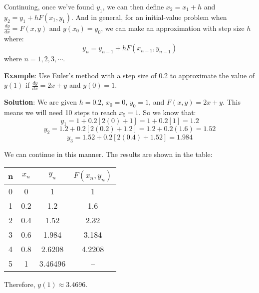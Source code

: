 Continuing, once we've found $y_1$, we can then define $x_2 = x_1 + h$ and 
$y_2 = y_1 + hF(x_1, y_1)$. And in general, for an initial-value problem when 
$\frac{dy}{dx} = F(x, y)$ and $y(x_0) = y_0$, we can make an approximation 
with step size $h$ where:
$$y_n = y_{n-1} + hF(x_{n-1},y_{n-1})$$
where $n = 1, 2, 3, \cdots$. 

\textbf{Example}: Use Euler's method with a step size of 0.2 to approximate 
the value of $y(1)$ if $\frac{dy}{dx} = 2x + y$ and $y(0) = 1$. 

\textbf{Solution}: We are given $h = 0.2$, $x_0 = 0$, $y_0 = 1$, and $F(x, y) 
= 2x + y$. This means we will need 10 steps to reach $x_{5} = 1$. So we know 
that:
$$y_1 = 1 + 0.2[2(0) + 1] = 1 + 0.2[1] = 1.2$$
$$y_2 = 1.2 + 0.2[2(0.2) + 1.2] = 1.2 + 0.2(1.6) = 1.52$$
$$y_3 = 1.52 + 0.2[2(0.4) + 1.52] = 1.984$$

We can continue in this manner. The results are shown in the table:
\begin{center}
\begin{tabular}{|c|c|c|c|}\hline
n & $x_n$ & $y_n$ & $F(x_n, y_n)$ \\\hline
0 & 0 & 1 & 1\\\hline
1 & 0.2 & 1.2 & 1.6\\\hline
2 & 0.4 & 1.52 & 2.32\\\hline
3 & 0.6 & 1.984 & 3.184\\\hline
4 & 0.8 & 2.6208 & 4.2208\\\hline
5 & 1 & 3.46496 & --\\\hline
\end{tabular}
\end{center}

Therefore, $y(1) \approx 3.4696$.